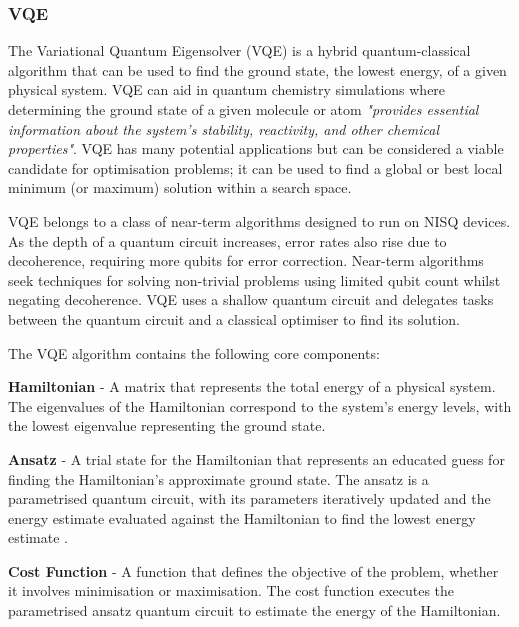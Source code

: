 \documentclass{article}
\begin{document}
{\subsubsection{VQE}

The Variational Quantum Eigensolver (VQE) is a hybrid quantum-classical algorithm that can be used to find the ground state, the lowest energy, of a given physical system\cite{wikivqe}. VQE can aid in quantum chemistry simulations where determining the ground state of a given molecule or atom \textit{"provides essential information about the system's stability, reactivity, and other chemical properties"}\cite{queragroundstate}. VQE has many potential applications but can be considered a viable candidate for optimisation problems; it can be used to find a global or best local minimum (or maximum) solution within a search space\cite{vqeqiskit}\cite{VQEMax}. 

VQE belongs to a class of near-term algorithms designed to run on NISQ devices. As the depth of a quantum circuit increases, error rates also rise due to decoherence, requiring more qubits for error correction. Near-term algorithms seek techniques for solving non-trivial problems using limited qubit count whilst negating decoherence\cite{Huang_2023}. VQE uses a shallow quantum circuit and delegates tasks between the quantum circuit and a classical optimiser to find its solution\cite{vqeqiskit}\cite{Peruzzo2014}.

The VQE algorithm contains the following core components:

\textbf{Hamiltonian} - A matrix that represents the total energy of a physical system\cite{hamiltonian}. The eigenvalues of the Hamiltonian correspond to the system's energy levels, with the lowest eigenvalue representing the ground state\cite{vqeqiskit}.

\textbf{Ansatz} - A trial state for the Hamiltonian that represents an educated guess for finding the Hamiltonian's approximate ground state. The ansatz is a parametrised quantum circuit, with its parameters iteratively updated and the energy estimate evaluated against the Hamiltonian to find the lowest energy estimate\cite{ansatz} \cite{wikiansatz} \cite{Tutorial}.

\textbf{Cost Function} - A function that defines the objective of the problem, whether it involves minimisation or maximisation. The cost function executes the parametrised ansatz quantum circuit to estimate the energy of the Hamiltonian\cite{Tutorial}\cite{vqeqiskit}.

}
\end{document}
